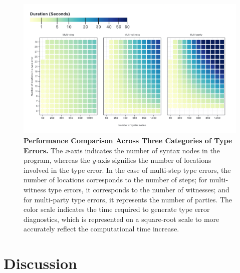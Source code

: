 \documentclass[pdflatex,lineno,sn-nature,Numbered]{sn-jnl}%
\begin{document}

\begin{figure}[ht]
    \centering
    \includegraphics[width=\linewidth]{images/DurationByCategory.png}
\caption{{\bf Performance Comparison Across Three Categories of Type Errors.} The {\it x}-axis indicates the number of syntax nodes in the program, whereas the {\it y}-axis signifies the number of locations involved in the type error. In the case of multi-step type errors, the number of locations corresponds to the number of steps; for multi-witness type errors, it corresponds to the number of witnesses; and for multi-party type errors, it represents the number of parties. The color scale indicates the time required to generate type error diagnostics, which is represented on a square-root scale to more accurately reflect the computational time increase.}
    \label{fig:compare-time}
\end{figure}


\section{Discussion} \label{sec:discussion}
\end{document}
